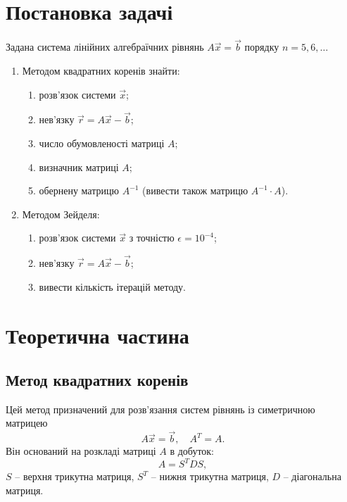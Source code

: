 




\section{Постановка задачі}

Задана система лінійних алгебраїчних рівнянь $A \vec x = \vec b$ порядку $n = 5, 6, \ldots$

\begin{enumerate}
	\item Методом квадратних коренів знайти:
	\begin{enumerate}
		\item розв'язок системи $\vec x$;
		\item нев'язку $\vec r = A \vec x - \vec b$;
		\item число обумовленості матриці $A$;
		\item визначник матриці $A$;
		\item обернену матрицю $A^{-1}$ (вивести також матрицю $A^{-1} \cdot A$).
	\end{enumerate}
	\item Методом Зейделя:
	\begin{enumerate}
		\item розв'язок системи $\vec x$ з точністю $\epsilon = 10^{-4}$;
		\item нев'язку $\vec r = A \vec x - \vec b$;
		\item вивести кількість ітерацій методу.
	\end{enumerate}
\end{enumerate}

\section{Теоретична частина}

\subsection{Метод квадратних коренів}
Цей метод призначений для розв'язання систем рівнянь із симетричною матрицею
\begin{equation}
	\label{eq:3.6}
	A \vec x = \vec b, \quad A^T = A.
\end{equation}
Він оснований на розкладі матриці $A$ в добуток:
\begin{equation}
	\label{eq:3.7}
	A = S^T D S,
\end{equation}
$S$ -- верхня трикутна матриця, $S^T$ -- нижня трикутна матриця, $D$ -- діагональна матриця. \\

